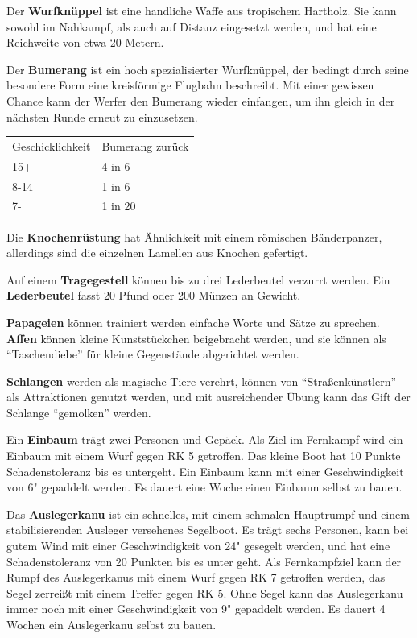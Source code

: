 \documentclass[11pt]{wbzine}
\begin{document}
\begin{multicols}{2}
Der \textbf{Wurfknüppel} ist eine handliche Waffe aus tropischem
Hartholz. Sie kann sowohl im Nahkampf, als auch auf Distanz
eingesetzt werden, und hat eine Reichweite von etwa 20 Metern.

Der \textbf{Bumerang} ist ein hoch spezialisierter Wurfknüppel, der
bedingt durch seine besondere Form eine kreisförmige Flugbahn
beschreibt. Mit einer gewissen Chance kann der Werfer den Bumerang
wieder einfangen, um ihn gleich in der nächsten Runde erneut zu
einzusetzen.

\begin{tabularx}{\columnwidth}{lZ}
    Geschicklichkeit & Bumerang zurück \\
    15+ & 4 in 6 \\
    8-14 & 1 in 6 \\
    7- & 1 in 20 \\
\end{tabularx}

Die \textbf{Knochenrüstung} hat Ähnlichkeit mit einem römischen
Bänderpanzer, allerdings sind die einzelnen Lamellen aus Knochen
gefertigt.

Auf einem \textbf{Tragegestell} können bis zu drei Lederbeutel
verzurrt werden. Ein \textbf{Lederbeutel} fasst 20 Pfund oder 200
Münzen an Gewicht.

\textbf{Papageien} können trainiert werden einfache Worte und Sätze
zu sprechen. \textbf{Affen} können kleine Kunststückchen beigebracht
werden, und sie können als ``Taschendiebe'' für kleine Gegenstände
abgerichtet werden.

\textbf{Schlangen} werden als magische Tiere verehrt, können von
``Straßenkünstlern'' als Attraktionen genutzt werden, und mit
ausreichender Übung kann das Gift der Schlange ``gemolken'' werden.

Ein \textbf{Einbaum} trägt zwei Personen und Gepäck. Als Ziel im
Fernkampf wird ein Einbaum mit einem Wurf gegen RK 5 getroffen. Das
kleine Boot hat 10 Punkte Schadenstoleranz bis es untergeht. Ein
Einbaum kann mit einer Geschwindigkeit von 6" gepaddelt werden. Es
dauert eine Woche einen Einbaum selbst zu bauen.

Das \textbf{Auslegerkanu} ist ein schnelles, mit einem schmalen
Hauptrumpf und einem stabilisierenden Ausleger versehenes Segelboot.
Es trägt sechs Personen, kann bei gutem Wind mit einer
Geschwindigkeit von 24" gesegelt werden, und hat eine
Schadenstoleranz von 20 Punkten bis es unter geht. Als Fernkampfziel
kann der Rumpf des Auslegerkanus mit einem Wurf gegen RK 7 getroffen
werden, das Segel zerreißt mit einem Treffer gegen RK 5. Ohne Segel
kann das Auslegerkanu immer noch mit einer Geschwindigkeit von 9"
gepaddelt werden. Es dauert 4 Wochen ein Auslegerkanu selbst zu
bauen.


\end{multicols}
\end{document}
